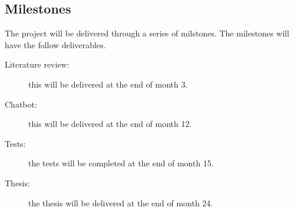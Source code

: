   \subsection{Milestones}
    The project will be delivered through a series of milstones. The milestones
    will have the follow deliverables.
    \begin{description}
      \item[Literature review:] this will be delivered at the end of month 3.
      \item[Chatbot:] this will be delivered at the end of month 12.
      \item[Tests:] the tests will be completed at the end of month 15.
      \item[Thesis:] the thesis will be delivered at the end of month 24.
    \end{description}


  
  


